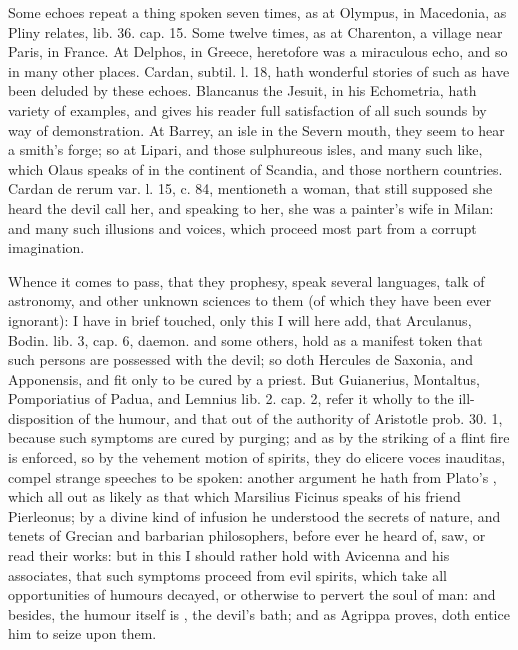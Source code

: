 {Some echoes repeat a thing spoken seven times, as at Olympus, in
Macedonia, as Pliny relates, lib. 36. cap. 15. Some twelve times, as at
Charenton, a village near Paris, in France. At Delphos, in Greece,
heretofore was a miraculous echo, and so in many other places. Cardan,
subtil. l. 18, hath wonderful stories of such as have been deluded by
these echoes. Blancanus the Jesuit, in his Echometria, hath variety of
examples, and gives his reader full satisfaction of all such sounds by
way of demonstration. At Barrey, an isle in the Severn mouth,
they seem to hear a smith's forge; so at Lipari, and those sulphureous
isles, and many such like, which Olaus speaks of in the continent of
Scandia, and those northern countries. Cardan de rerum var. l. 15, c.
84, mentioneth a woman, that still supposed she heard the devil call
her, and speaking to her, she was a painter's wife in Milan: and many
such illusions and voices, which proceed most part from a corrupt
imagination.

Whence it comes to pass, that they prophesy, speak several languages, talk of
astronomy, and other unknown sciences to them (of which they have been ever
ignorant): I have in brief touched, only this I will here
add, that Arculanus, Bodin. lib. 3, cap. 6, daemon. and some others,
 hold as a manifest token that such persons are possessed
with the devil; so doth Hercules de Saxonia, and
Apponensis, and fit only to be cured by a priest. But Guianerius, Montaltus, Pomporiatius
of Padua, and Lemnius lib. 2. cap. 2, refer it wholly to the ill-disposition of
the humour, and that out of the authority of Aristotle
prob. 30. 1, because such symptoms are cured by purging; and as by the striking
of a flint fire is enforced, so by the vehement motion of spirits, they do
elicere voces inauditas, compel strange speeches to be spoken: another argument
he hath from Plato's , which all out as likely as that which
Marsilius Ficinus speaks of his friend Pierleonus; by a
divine kind of infusion he understood the secrets of nature, and tenets of
Grecian and barbarian philosophers, before ever he heard of, saw, or read their
works: but in this I should rather hold with Avicenna and his associates, that
such symptoms proceed from evil spirits, which take all opportunities of
humours decayed, or otherwise to pervert the soul of man: and besides, the
humour itself is , the devil's bath; and as Agrippa proves, doth
entice him to seize upon them.
}
